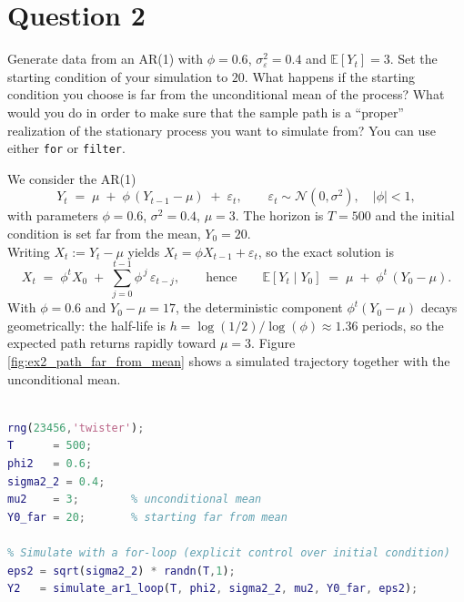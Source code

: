 \documentclass[dvipsnames,11pt]{article}
\begin{document}
\section*{Question 2}
\setcounter{section}{2}

    Generate data from an AR(1) with $\phi=0.6$, $\sigma_\varepsilon^2=0.4$ and $\mathbb{E}[Y_t]=3$. Set the starting condition of your simulation to $20$. What happens if the starting condition you choose is far from the unconditional mean of the process? What would you do in order to make sure that the sample path is a ``proper'' realization of the stationary process you want to simulate from? You can use either \texttt{for} or \texttt{filter}.

    \begin{solution}

        We consider the AR(1)
        \begin{equation}
            Y_t \;=\; \mu \;+\; \phi\,(Y_{t-1}-\mu) \;+\; \varepsilon_t,
            \qquad \varepsilon_t \sim \mathcal{N}(0,\sigma^2),\quad |\phi|<1,
        \end{equation}
        with parameters $\phi=0.6$, $\sigma^2=0.4$, $\mu=3$. The horizon is $T=500$ and the initial condition is set far from the mean, $Y_0=20$.\\

        Writing $X_t := Y_t-\mu$ yields $X_t=\phi X_{t-1}+\varepsilon_t$, so the exact solution is
        \begin{equation}
            X_t \;=\; \phi^t X_0 \;+\; \sum_{j=0}^{t-1} \phi^{\,j}\,\varepsilon_{t-j},
            \qquad\text{hence}\qquad
            \mathbb{E}[Y_t \mid Y_0] \;=\; \mu \;+\; \phi^t\,(Y_0-\mu).
        \end{equation}
        With $\phi=0.6$ and $Y_0-\mu=17$, the deterministic component $\phi^t(Y_0-\mu)$ decays geometrically: the half-life is
        $h=\log(1/2)/\log(\phi)\approx 1.36$ periods, so the expected path returns rapidly toward $\mu=3$.
        Figure \ref{fig:ex2_path_far_from_mean} shows a simulated trajectory together with the unconditional mean.

\begin{lstlisting}[language=Matlab]
% AR(1) with phi=0.6, sigma^2=0.4, E[Y_t]=3, start Y0=20

rng(23456,'twister');
T      = 500;
phi2   = 0.6;
sigma2_2 = 0.4;
mu2    = 3;        % unconditional mean
Y0_far = 20;       % starting far from mean

% Simulate with a for-loop (explicit control over initial condition)
eps2 = sqrt(sigma2_2) * randn(T,1);
Y2   = simulate_ar1_loop(T, phi2, sigma2_2, mu2, Y0_far, eps2);


\end{lstlisting}
\end{solution}
\end{document}
